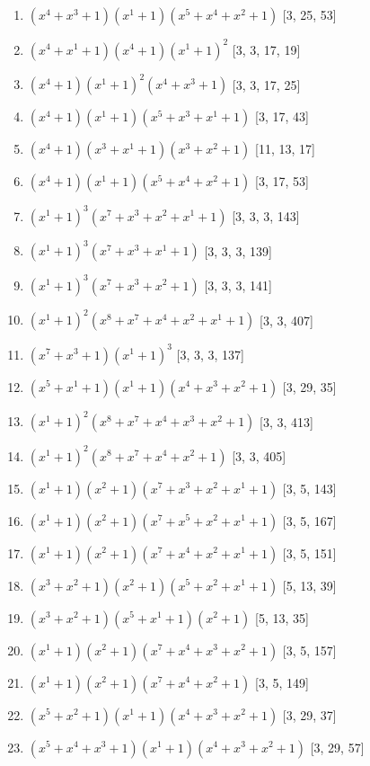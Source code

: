 \documentclass[10pt,twocolumn]{article}
\begin{document}
\begin{enumerate}
\item $(x^{4} + x^{3} + 1)(x^{1} + 1)(x^{5} + x^{4} + x^{2} + 1)$  [3, 25, 53]
\item $(x^{4} + x^{1} + 1)(x^{4} + 1)(x^{1} + 1)^{2}$  [3, 3, 17, 19]
\item $(x^{4} + 1)(x^{1} + 1)^{2}(x^{4} + x^{3} + 1)$  [3, 3, 17, 25]
\item $(x^{4} + 1)(x^{1} + 1)(x^{5} + x^{3} + x^{1} + 1)$  [3, 17, 43]
\item $(x^{4} + 1)(x^{3} + x^{1} + 1)(x^{3} + x^{2} + 1)$  [11, 13, 17]
\item $(x^{4} + 1)(x^{1} + 1)(x^{5} + x^{4} + x^{2} + 1)$  [3, 17, 53]
\item $(x^{1} + 1)^{3}(x^{7} + x^{3} + x^{2} + x^{1} + 1)$  [3, 3, 3, 143]
\item $(x^{1} + 1)^{3}(x^{7} + x^{3} + x^{1} + 1)$  [3, 3, 3, 139]
\item $(x^{1} + 1)^{3}(x^{7} + x^{3} + x^{2} + 1)$  [3, 3, 3, 141]
\item $(x^{1} + 1)^{2}(x^{8} + x^{7} + x^{4} + x^{2} + x^{1} + 1)$  [3, 3, 407]
\item $(x^{7} + x^{3} + 1)(x^{1} + 1)^{3}$  [3, 3, 3, 137]
\item $(x^{5} + x^{1} + 1)(x^{1} + 1)(x^{4} + x^{3} + x^{2} + 1)$  [3, 29, 35]
\item $(x^{1} + 1)^{2}(x^{8} + x^{7} + x^{4} + x^{3} + x^{2} + 1)$  [3, 3, 413]
\item $(x^{1} + 1)^{2}(x^{8} + x^{7} + x^{4} + x^{2} + 1)$  [3, 3, 405]
\item $(x^{1} + 1)(x^{2} + 1)(x^{7} + x^{3} + x^{2} + x^{1} + 1)$  [3, 5, 143]
\item $(x^{1} + 1)(x^{2} + 1)(x^{7} + x^{5} + x^{2} + x^{1} + 1)$  [3, 5, 167]
\item $(x^{1} + 1)(x^{2} + 1)(x^{7} + x^{4} + x^{2} + x^{1} + 1)$  [3, 5, 151]
\item $(x^{3} + x^{2} + 1)(x^{2} + 1)(x^{5} + x^{2} + x^{1} + 1)$  [5, 13, 39]
\item $(x^{3} + x^{2} + 1)(x^{5} + x^{1} + 1)(x^{2} + 1)$  [5, 13, 35]
\item $(x^{1} + 1)(x^{2} + 1)(x^{7} + x^{4} + x^{3} + x^{2} + 1)$  [3, 5, 157]
\item $(x^{1} + 1)(x^{2} + 1)(x^{7} + x^{4} + x^{2} + 1)$  [3, 5, 149]
\item $(x^{5} + x^{2} + 1)(x^{1} + 1)(x^{4} + x^{3} + x^{2} + 1)$  [3, 29, 37]
\item $(x^{5} + x^{4} + x^{3} + 1)(x^{1} + 1)(x^{4} + x^{3} + x^{2} + 1)$  [3, 29, 57]

\end{enumerate}
\end{document}
